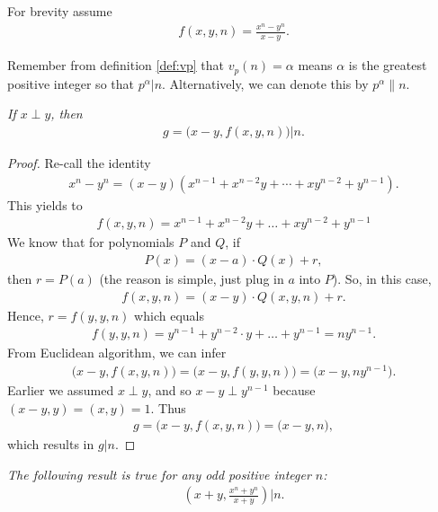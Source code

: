\documentclass[main.tex]{subfile}
\begin{document}
	
	For brevity assume 
	\begin{align*}
		f(x,y,n)=\frac{x^n-y^n}{x-y}.
	\end{align*}
	
	Remember from definition \eqref{def:vp} that $v_{p}(n)=\alpha$ means $\alpha$ is the greatest positive integer so that $p^\alpha|n$. Alternatively, we can denote this by $p^\alpha\|n$.
	
	\begin{theorem}\slshape\label{thm:egl}
		If $x\perp y$, then
			\begin{align*}
				g=\big(x-y,f(x,y,n)\big)\big|n.
			\end{align*}
	\end{theorem}
	
	\begin{proof}
		Re-call the identity
			\begin{align*}
				x^n-y^n=(x-y)\left(x^{n-1}+x^{n-2}y+\cdots+xy^{n-2}+y^{n-1}\right).
			\end{align*}
		This yields to
			\begin{align*}
				f(x,y,n)=x^{n-1}+x^{n-2}y+\ldots+xy^{n-2}+y^{n-1}
			\end{align*}
		We know that for polynomials $P$ and $Q$, if
			\begin{align*}
				P(x)=(x-a)\cdot Q(x)+r,
			\end{align*}
		then $r=P(a)$ (the reason is simple, just plug in $a$ into $P$). So, in this case,
			\begin{align*}
				f(x,y,n)=(x-y)\cdot Q(x,y,n)+r.
			\end{align*} 
		Hence, $r=f(y,y,n)$ which equals
		\begin{align*}
			f(y,y,n)=y^{n-1}+y^{n-2}\cdot y+\ldots+y^{n-1}=ny^{n-1}.
		\end{align*}
		From Euclidean algorithm, we can infer 
		\begin{align*}
			\big(x-y,f(x,y,n)\big)=\big(x-y,f(y,y,n)\big)=\big(x-y,ny^{n-1}\big).
		\end{align*}
		Earlier we assumed $x\perp y$, and so $x-y\perp y^{n-1}$ because $(x-y,y)=(x,y)=1$. Thus 
		\begin{align*}
			g=\big(x-y,f(x,y,n)\big)=\big(x-y,n\big),
		\end{align*}
		which results in $g|n$.
	\end{proof}
	
	\begin{corollary}\slshape
		The following result is true for any odd positive integer $n$:
		\begin{align*}
			\left(x+y,\frac{x^n+y^n}{x+y}\right)\Big|n.
		\end{align*}
	\end{corollary}
	
\end{document}
